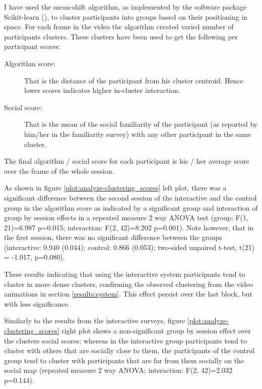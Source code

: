 \documentclass[a4paper,11pt]{article}
\begin{document}
I have used the mean-shift algorithm, as implemented by the software package Scikit-learn (\cite{scikit-learn}), to cluster participants into groups based on their positioning in space.
For each frame in the video the algorithm created varied number of participants clusters.
These clusters have been used to get the following per participant scores:

\begin{description}
    \item[Algorithm score:] That is the distance of the participant from his cluster centroid.
        Hence lower scores indicates higher in-cluster interaction.
    \item[Social score:] That is the mean of the social familiarity of the participant (as reported by him/her in the familiarity survey) with any other participant in the same cluster.
\end{description}

The final algorithm / social score for each participant is his / her average score over the frame of the whole session.

As shown in figure \ref{plot:analyze-clustering_scores} left plot, there was a significant difference between the second session of the interactive and the control group in the algorithm score as indicated by a significant group and interaction of group by session effects in a repeated measure 2 way ANOVA test (group: F(1, 21)=6.987 p=0.015; interaction: F(2, 42)=8.202 p=0.001).
Note however, that in the first session, there was no significant difference between the groups (interactive: 0.940 (0.044); control: 0.866 (0.053); two-sided unpaired t-test, t(21) = -1.017, p=0.080).

These results indicating that using the interactive system participants tend to cluster in more dense clusters, confirming the observed clustering from the video animations in section \ref{results:system}.
This effect persist over the last block, but with less significance.

Similarly to the results from the interactive surveys, figure \ref{plot:analyze-clustering_scores} right plot shows a non-significant group by session effect over the clusters social scores; whereas in the interactive group participants tend to cluster with others that are socially close to them, the participants of the control group tend to cluster with participants that are far from them socially on the social map (repeated measure 2 way ANOVA; interaction: F(2, 42)=2.032 p=0.144).
\end{document}
